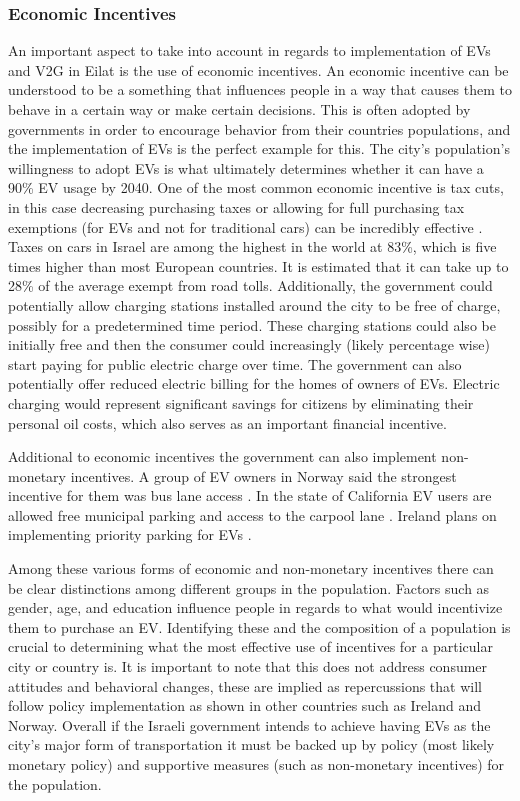 \documentclass[12pt]{article}                         %
\begin{document}
\subsubsection{Economic Incentives}
An important aspect to take into account in regards to implementation of EVs and V2G in Eilat is the use of economic incentives. An economic incentive can be understood to be a something that influences people in a way that causes them to behave in a certain way or make certain decisions. This is often adopted by governments in order to encourage behavior from their countries populations, and the implementation of EVs is the perfect example for this. The city’s population’s willingness to adopt EVs is what ultimately determines whether it can have a 90\% EV usage by 2040. One of the most common economic incentive is tax cuts, in this case decreasing purchasing taxes or allowing for full purchasing tax exemptions (for EVs and not for traditional cars) can be incredibly effective \cite{Katsovitch2011JIMS:Highest}. Taxes on cars in Israel are among the highest in the world at 83\%, which is five times higher than most European countries. It is estimated that it can take up to 28\% of the average exempt from road tolls. Additionally, the government could potentially allow charging stations installed around the city to be free of charge, possibly for a predetermined time period. These charging stations could also be initially free and then the consumer could increasingly (likely percentage wise) start paying for public electric charge over time. The government can also potentially offer reduced electric billing for the homes of owners of EVs. Electric charging would represent significant savings for citizens by eliminating their personal oil costs, which also serves as an important financial incentive.

Additional to economic incentives the government can also implement non-monetary incentives. A group of EV owners in Norway said the strongest incentive for them was bus lane access \cite{Bjerkan2016IncentivesNorway}. In the state of California EV users are allowed free municipal parking and access to the carpool lane \cite{TeslaElectricIncentives}. Ireland plans on implementing priority parking for EVs \cite{SustainableEnergyAuthorityofIreland2011ElectricRoadmap}.

Among these various forms of economic and non-monetary incentives there can be clear distinctions among different groups in the population. Factors such as gender, age, and education influence people in regards to what would incentivize them to purchase an EV. Identifying these and the composition of a population is crucial to determining what the most effective use of incentives for a particular city or country is. It is important to note that this does not address consumer attitudes and behavioral changes, these are implied as repercussions that will follow policy implementation as shown in other countries such as Ireland and Norway\cite{SustainableEnergyAuthorityofIreland2011ElectricRoadmap,Bjerkan2016IncentivesNorway}. Overall if the Israeli government intends to achieve having EVs as the city's major form of transportation it must be backed up by policy (most likely monetary policy) and supportive measures (such as non-monetary incentives) for the population.
\end{document}
